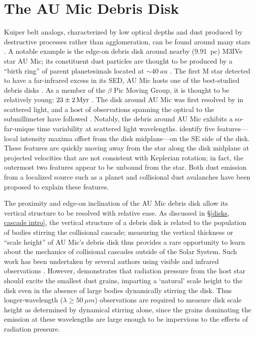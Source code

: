 \documentclass[12pt,oneside]{book}
\begin{document}
\section{The AU Mic Debris Disk}
\label{AU Mic intro}

Kuiper belt analogs, characterized by low optical depths and dust produced by destructive processes rather than agglomeration, can be found around many stars \citep{hughes18}.
A notable example is the edge-on debris disk around nearby (\SI{9.91}{pc}) M3IVe star AU Mic; its constituent dust particles are thought to be produced by a ``birth ring'' of parent planetesimals located at $\sim \SI{40}{au}$ \citep{vanleeuwen07, strubbe&chiang06}.
The first M star detected to have a far-infrared excess in its SED, AU Mic hosts one of the best-studied debris disks \citep[][; see Figure \ref{fig: SED}]{moshir90}. 
As a member of the $\beta$ Pic Moving Group, it is thought to be relatively young: $\SI{23 \pm 2}{Myr}$ \citep{binks&jeffries14,mamajek&bell14,malo14}. 
The disk around AU Mic was first resolved by \cite{kalas04} in scattered light, and a host of observations spanning the optical to the submillimeter have followed \citep{augereau&beust06,macgregor13,matthews15,schneider14,wang15}. 
Notably, the debris around AU Mic exhibits a so-far-unique time variability at scattered light wavelengths.
\cite{boccaletti15} identify five features---local intensity maxima offset from the disk midplane---on the SE side of the disk. 
These features are quickly moving away from the star along the disk midplane at projected velocities that are not consistent with Keplerian rotation; in fact, the outermost two features appear to be unbound from the star. 
Both dust emission from a localized source such as a planet \citep{boccaletti15,sezestre17} and collisional dust avalanches \citep{chiang&fung17} have been proposed to explain these features.

The proximity and edge-on inclination of the AU Mic debris disk allow its vertical structure to be resolved with relative ease.
As discussed in \S \ref{disks, cascade intro}, the vertical structure of a debris disk is related to the population of bodies stirring the collisional cascade; measuring the vertical thickness or ``scale height'' of AU Mic's debris disk thus provides a rare opportunity to learn about the mechanics of collisional cascades outside of the Solar System.
Such work has been undertaken by several authors using visible and infrared observations \citep{artymowicz97,thebault&augereau07,quillen07}.
However, \cite{thebault09} demonstrates that radiation pressure from the host star should excite the smallest dust grains, imparting a `natural' scale height to the disk even in the absence of large bodies dynamically stirring the disk. 
Thus longer-wavelength ($\lambda \geq \SI{50}{\mu m}$) observations are required to measure disk scale height as determined by dynamical stirring alone, since the grains dominating the emission at these wavelengths are large enough to be impervious to the effects of radiation pressure.
\end{document}
